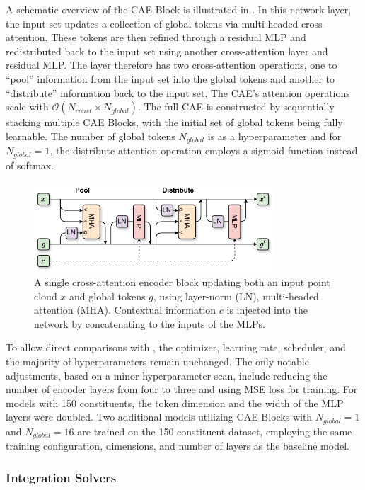 A schematic overview of the CAE Block is illustrated in .
In this network layer, the input set updates a collection of global tokens via multi-headed cross-attention.
These tokens are then refined through a residual MLP and redistributed back to the input set using another cross-attention layer and residual MLP.
The layer therefore has two cross-attention operations, one to ``pool'' information from the input set into the global tokens and another to ``distribute'' information back to the input set.
The CAE's attention operations scale with $\mathcal{O}(N_{const} \times N_{global})$.
The full CAE is constructed by sequentially stacking multiple CAE Blocks, with the initial set of global tokens being fully learnable.
The number of global tokens $N_{global}$ is as a hyperparameter and for $N_{global}=1$, the distribute attention operation employs a sigmoid function instead of softmax.

\begin{figure}[htpb]
    \centering
    \includegraphics[width=0.8\textwidth]{Figures/jet_generation/CAEB.pdf}
    \caption{A single cross-attention encoder block updating both an input point cloud $x$ and global tokens $g$, using layer-norm (LN), multi-headed attention (MHA). Contextual information $c$ is injected into the network by concatenating to the inputs of the MLPs.}
    \label{fig:cae_network}
\end{figure}

To allow direct comparisons with \pcjedi, the optimizer, learning rate, scheduler, and the majority of hyperparameters remain unchanged.
The only notable adjustments, based on a minor hyperparameter scan, include reducing the number of encoder layers from four to three and using MSE loss for training.
For models with 150 constituents, the token dimension and the width of the MLP layers were doubled.
Two additional models utilizing CAE Blocks with $N_{global}=1$ and $N_{global}=16$ are trained on the 150 constituent dataset, employing the same training configuration, dimensions, and number of layers as the baseline model.

\subsubsection{Integration Solvers}

